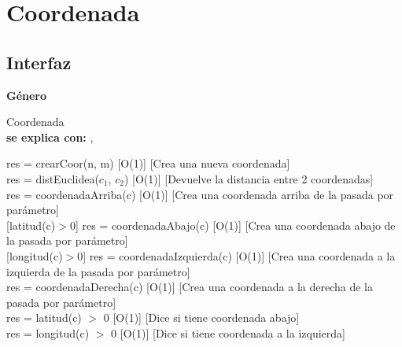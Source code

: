 \section{Coordenada}


\subsection{Interfaz}

\parbox {1,7cm}{{\bf Género}} Coordenada \\
{\bf se explica con:}  , \\
\medskip

{res = crearCoor(n, m)}
[O(1)]
[Crea una nueva coordenada]
\\

{res = distEuclidea($c_1$, $c_2$)}
[O(1)]
[Devuelve la distancia entre 2 coordenadas]
\\

{res = coordenadaArriba(c)}
[O(1)]
[Crea una coordenada arriba de la pasada por parámetro]
\\

[latitud(c)$>$0]
{res = coordenadaAbajo(c)}
[O(1)]
[Crea una coordenada abajo de la pasada por parámetro]
\\

[longitud(c)$>$0]
{res = coordenadaIzquierda(c)}
[O(1)]
[Crea una coordenada a la izquierda de la pasada por parámetro]
\\

{res = coordenadaDerecha(c)}
[O(1)]
[Crea una coordenada a la derecha de la pasada por parámetro]
\\

{res = latitud(c) $>$ 0}
[O(1)]
[Dice si tiene coordenada abajo]
\\

{res = longitud(c) $>$ 0}
[O(1)]
[Dice si tiene coordenada a la izquierda]
\\

